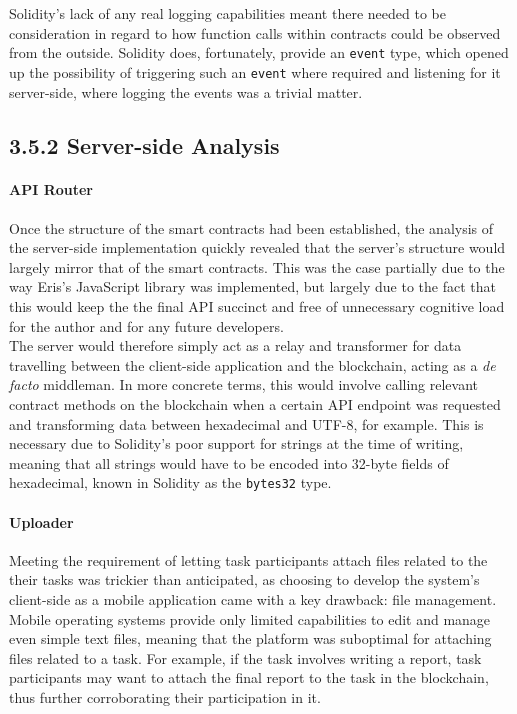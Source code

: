 Solidity's lack of any real logging capabilities meant there needed to
be consideration in regard to how function calls within contracts could
be observed from the outside. Solidity does, fortunately, provide an
\texttt{event} type, which opened up the possibility of triggering such
an \texttt{event} where required and listening for it server-side, where
logging the events was a trivial matter.

\subsection{3.5.2 Server-side Analysis}\label{server-side-analysis}

\paragraph{API Router}\label{api-router}

Once the structure of the smart contracts had been established, the
analysis of the server-side implementation quickly revealed that the
server's structure would largely mirror that of the smart contracts.
This was the case partially due to the way Eris's JavaScript library was
implemented, but largely due to the fact that this would keep the the
final API succinct and free of unnecessary cognitive load for the author
and for any future developers.\\
The server would therefore simply act as a relay and transformer for
data travelling between the client-side application and the blockchain,
acting as a \emph{de facto} middleman. In more concrete terms, this
would involve calling relevant contract methods on the blockchain when a
certain API endpoint was requested and transforming data between
hexadecimal and UTF-8, for example. This is necessary due to Solidity's
poor support for strings at the time of writing, meaning that all
strings would have to be encoded into 32-byte fields of hexadecimal,
known in Solidity as the \texttt{bytes32} type.

\paragraph{Uploader}\label{uploader}

Meeting the requirement of letting task participants attach files
related to the their tasks was trickier than anticipated, as choosing to
develop the system's client-side as a mobile application came with a key
drawback: file management. Mobile operating systems provide only limited
capabilities to edit and manage even simple text files, meaning that the
platform was suboptimal for attaching files related to a task. For
example, if the task involves writing a report, task participants may
want to attach the final report to the task in the blockchain, thus
further corroborating their participation in it.

